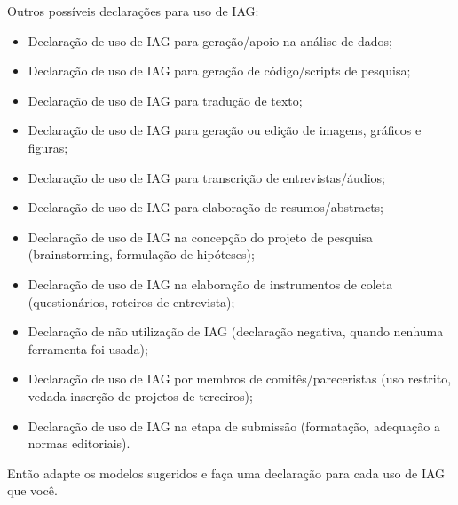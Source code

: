     Outros possíveis declarações para uso de IAG:
    \begin{itemize}
        \item Declaração de uso de IAG para geração/apoio na análise de dados;
        \item Declaração de uso de IAG para geração de código/scripts de pesquisa;
        \item Declaração de uso de IAG para tradução de texto;
        \item Declaração de uso de IAG para geração ou edição de imagens, gráficos e figuras;
        \item Declaração de uso de IAG para transcrição de entrevistas/áudios;
        \item Declaração de uso de IAG para elaboração de resumos/abstracts;
        \item Declaração de uso de IAG na concepção do projeto de pesquisa (brainstorming, formulação de hipóteses);
        \item Declaração de uso de IAG na elaboração de instrumentos de coleta (questionários, roteiros de entrevista);
        \item Declaração de não utilização de IAG (declaração negativa, quando nenhuma ferramenta foi usada);
        \item Declaração de uso de IAG por membros de comitês/pareceristas (uso restrito, vedada inserção de projetos de terceiros);
        \item Declaração de uso de IAG na etapa de submissão (formatação, adequação a normas editoriais).
    \end{itemize}

    Então adapte os modelos sugeridos e faça uma declaração para cada uso de IAG que você.